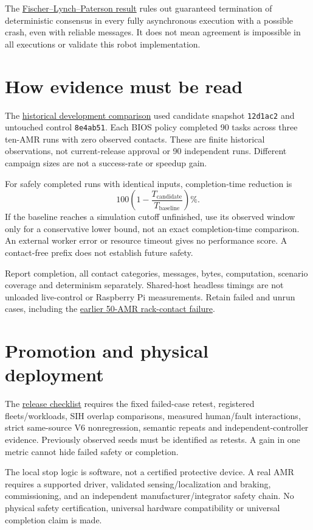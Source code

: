 \documentclass[12pt]{article}
\begin{document}
The \href{https://groups.csail.mit.edu/tds/papers/Lynch/jacm85.pdf}{Fischer--Lynch--Paterson result}
rules out guaranteed termination of deterministic consensus in every fully
asynchronous execution with a possible crash, even with reliable messages. It
does not mean agreement is impossible in all executions or validate this robot
implementation.

\section{How evidence must be read}
The \href{../artifacts/benchmarks/bios7-fixed-control-final-development.json}{historical development comparison}
used candidate snapshot \texttt{12d1ac2} and untouched control \texttt{8e4ab51}.
Each BIOS policy completed 90 tasks across three ten-AMR runs with zero observed
contacts. These are finite historical observations, not current-release approval
or 90 independent runs. Different campaign sizes are not a success-rate or speedup
gain.

For safely completed runs with identical inputs, completion-time reduction is
\[
100\left(1-\frac{T_{\mathrm{candidate}}}{T_{\mathrm{baseline}}}\right)\%.
\]
If the baseline reaches a simulation cutoff unfinished, use its observed window
only for a conservative lower bound, not an exact completion-time comparison.
An external worker error or resource timeout gives no performance score.
A contact-free prefix does not establish future safety.

Report completion, all contact categories, messages, bytes, computation, scenario
coverage and determinism separately. Shared-host headless timings are not unloaded
live-control or Raspberry Pi measurements. Retain failed and unrun cases, including
the \href{../artifacts/benchmarks/bios7-capacity-screen.json}{earlier 50-AMR rack-contact failure}.

\section{Promotion and physical deployment}
The \href{24-BIOS7-RELEASE-CHECKLIST.md}{release checklist} requires the fixed
failed-case retest, registered fleets/workloads, SIH overlap comparisons, measured
human/fault interactions, strict same-source V6 nonregression, semantic repeats and
independent-controller evidence. Previously observed seeds must be identified as
retests. A gain in one metric cannot hide failed safety or completion.

The local stop logic is software, not a certified protective device. A real AMR
requires a supported driver, validated sensing/localization and braking,
commissioning, and an independent manufacturer/integrator safety chain. No
physical safety certification, universal hardware compatibility or universal
completion claim is made.
\end{document}
